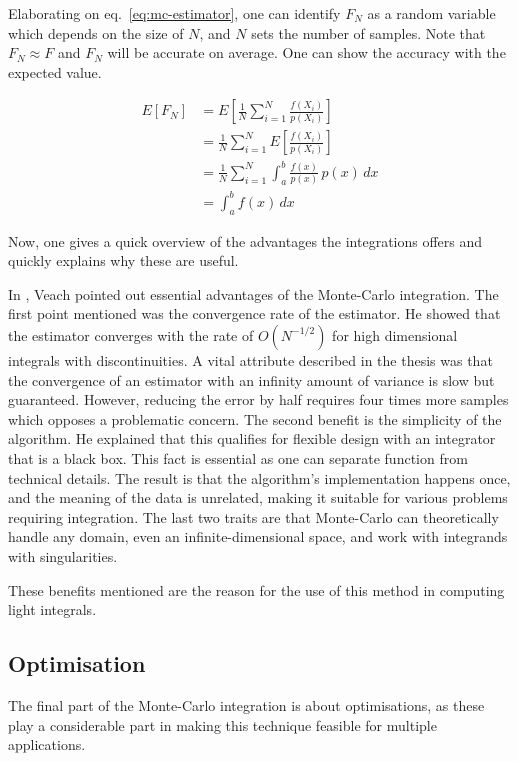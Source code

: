 Elaborating on eq.~\ref{eq:mc-estimator}, one can identify $F_N$ as a random variable which depends on the size of $N$, and $N$ sets the number of samples.
Note that $F_N \approx F$ and $F_N$ will be accurate on average.
One can show the accuracy with the expected value.

\begin{align*} 
E[F_N] &=E\left[\frac{1}{N}\sum_{i=1}^{N}\frac{f(X_i)}{p(X_i)}\right]\\
&=\frac{1}{N}\sum_{i=1}^{N}E\left[\frac{f(X_i)}{p(X_i)}\right]\\
&=\frac{1}{N}\sum_{i=1}^{N}\int_{a}^{b}\frac{f(x)}{p(x)}\,p(x)\,dx\\ &=\int_{a}^{b}f(x)\,dx 
\end{align*}

Now, one gives a quick overview of the advantages the integrations offers and quickly explains why these are useful.

In \cite{veach_robust_1997}, Veach pointed out essential advantages of the Monte-Carlo integration.
The first point mentioned was the convergence rate of the estimator.
He showed that the estimator converges with the rate of $O(N^{-1/2})$ for high dimensional integrals with discontinuities.
A vital attribute described in the thesis was that the convergence of an estimator with an infinity amount of variance is slow but guaranteed.
However, reducing the error by half requires four times more samples which opposes a problematic concern.
The second benefit is the simplicity of the algorithm.
He explained that this qualifies for flexible design with an integrator that is a black box.
This fact is essential as one can separate function from technical details.
The result is that the algorithm's implementation happens once, and the meaning of the data is unrelated, making it suitable for various problems requiring integration.
The last two traits are that Monte-Carlo can theoretically handle any domain, even an infinite-dimensional space, and work with integrands with singularities.

These benefits mentioned are the reason for the use of this method in computing light integrals.

\subsection{Optimisation}

The final part of the Monte-Carlo integration is about optimisations, as these play a considerable part in making this technique feasible for multiple applications.

